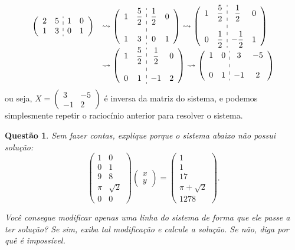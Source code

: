 \documentclass[a4paper,12pt]{article}
\newenvironment{sol}{\begin{tcolorbox}[breakable,colback=blue!5!white,colframe=blue!40!white,title=\normalsize {\sc{Solução}},coltitle=black]}{\end{tcolorbox}}
\newenvironment{augmatrix}{\left(\begin{array}}{\end{array}\right)}
\newtheorem{qst}{Questão}
\begin{document}
\begin{sol}
	\[\begin{array}{rl}
	\begin{augmatrix}{cc:cc}
	2&5&1&0\\1&3&0&1
	\end{augmatrix}&\rightsquigarrow\begin{augmatrix}{cc:cc}
	1&\dfrac{5}{2}&\dfrac{1}{2}&0\\&\\
	1&3&0&1
	\end{augmatrix}\rightsquigarrow\begin{augmatrix}{cc:cc}
	1&\dfrac{5}{2}&\dfrac{1}{2}&0\\&\\
	0&\dfrac{1}{2}&-\dfrac{1}{2}&1
	\end{augmatrix}\\&\rightsquigarrow\begin{augmatrix}{cc:cc}
	1&\dfrac{5}{2}&\dfrac{1}{2}&0\\&\\
	0&1&-1&2
	\end{augmatrix}\rightsquigarrow\begin{augmatrix}{cc:cc}
	1&0&3&-5\\&\\
	0&1&-1&2
	\end{augmatrix}
	\end{array}\]ou seja, $X=\begin{pmatrix}
	3&-5\\-1&2
	\end{pmatrix}$ é inversa da matriz do sistema, e podemos simplesmente repetir o raciocínio anterior para resolver o sistema.
\end{sol}
\begin{qst}
	Sem fazer contas, explique porque o sistema abaixo não possui solução:
	\[\begin{pmatrix}
		1&0\\0&1\\9&8\\\pi&\sqrt{2}\\0&0		
	\end{pmatrix}\begin{pmatrix}
	x\\y
\end{pmatrix}=\begin{pmatrix}
1\\1\\17\\\pi+\sqrt{2}\\1278
\end{pmatrix}.\]

Você consegue modificar apenas uma linha do sistema de forma que ele passe a ter solução? Se sim, exiba tal modificação e calcule a solução. Se não, diga por quê é impossível.
\end{qst}
\end{document}
